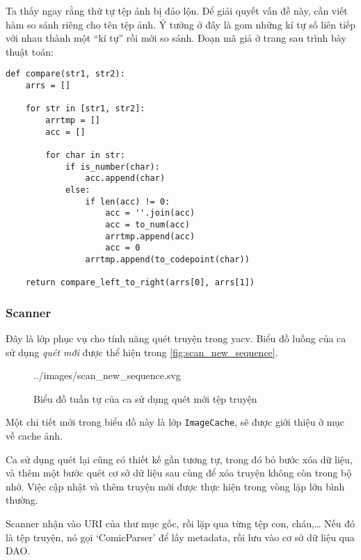 \documentclass[../../../../thesis]{subfiles}
\begin{document}
Ta thấy ngay rằng thứ tự tệp ảnh bị đảo lộn. Để giải quyết vấn đề này, cần viết
hàm so sánh riêng cho tên tệp ảnh. Ý tưởng ở đây là gom những kí tự số liên tiếp
với nhau thành một ``kí tự'' rồi mới so sánh. Đoạn mã giả ở trang sau trình bày
thuật toán:

\begin{Verbatim}[samepage=true]
def compare(str1, str2):
    arrs = []

    for str in [str1, str2]:
        arrtmp = []
        acc = []

        for char in str:
            if is_number(char):
                acc.append(char)
            else:
                if len(acc) != 0:
                    acc = ''.join(acc)
                    acc = to_num(acc)
                    arrtmp.append(acc)
                    acc = 0
                arrtmp.append(to_codepoint(char))

    return compare_left_to_right(arrs[0], arrs[1])
\end{Verbatim}



\subsubsection{Scanner}

Đây là lớp phục vụ cho tính năng quét truyện trong yacv. Biểu đồ luồng của ca sử
dụng \emph{quét mới} được thể hiện trong \autoref{fig:scan_new_sequence}.

\begin{figure}[H]
    \centering
    
        {../images/scan_new_sequence.svg}
    \caption{Biểu đồ tuần tự của ca sử dụng quét mới tệp truyện}
    \label{fig:scan_new_sequence}
\end{figure}

Một chi tiết mới trong biểu đồ này là lớp \texttt{ImageCache}, sẽ được giới
thiệu ở mục về cache ảnh.

Ca sử dụng quét lại cũng có thiết kế gần tương tự, trong đó bỏ bước xóa dữ liệu,
và thêm một bước quét cơ sở dữ liệu sau cùng để xóa truyện không còn trong bộ
nhớ. Việc cập nhật và thêm truyện mới được thực hiện trong vòng lặp lớn bình
thường.

Scanner nhận vào URI của thư mục gốc, rồi lặp qua từng tệp con, cháu,\ldots{}
Nếu đó là tệp truyện, nó gọi `ComicParser' để lấy metadata, rồi lưu vào cơ sở dữ
liệu qua DAO.
\end{document}
